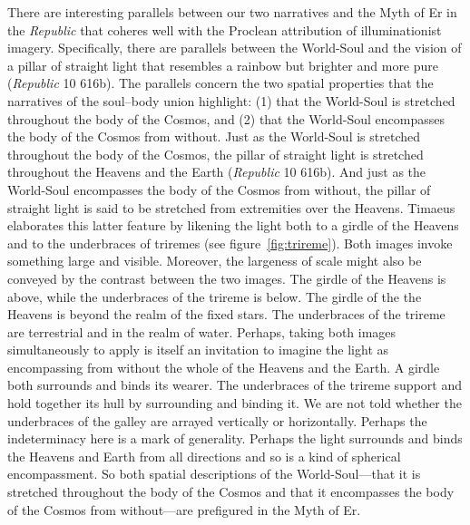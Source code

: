 There are interesting parallels between our two narratives and the Myth of Er in the \emph{Republic} that coheres well with the Proclean attribution of illuminationist imagery. Specifically, there are parallels between the World-Soul and the vision of a pillar of straight light that resembles a rainbow but brighter and more pure (\emph{Republic} 10 616b). The parallels concern the two spatial properties that the narratives of the soul--body union highlight: (1) that the World-Soul is stretched throughout the body of the Cosmos, and (2) that the World-Soul encompasses the body of the Cosmos from without. Just as the World-Soul is stretched throughout the body of the Cosmos, the pillar of straight light is stretched throughout the Heavens and the Earth (\emph{Republic} 10 616b). And just as the World-Soul encompasses the body of the Cosmos from without, the pillar of straight light is said to be stretched from extremities over the Heavens. Timaeus elaborates this latter feature by likening the light both to a girdle of the Heavens and to the underbraces of triremes (see figure~\ref{fig:trireme}). Both images invoke something large and visible. Moreover, the largeness of scale might also be conveyed by the contrast between the two images. The girdle of the Heavens is above, while the underbraces of the trireme is below. The girdle of the the Heavens is beyond the realm of the fixed stars. The underbraces of the trireme are terrestrial and in the realm of water. Perhaps, taking both images simultaneously to apply is itself an invitation to imagine the light as encompassing from without the whole of the Heavens and the Earth. A girdle both surrounds and binds its wearer. The underbraces of the trireme support and hold together its hull by surrounding and binding it. We are not told whether the underbraces of the galley are arrayed vertically or horizontally. Perhaps the indeterminacy here is a mark of generality. Perhaps the light surrounds and binds the Heavens and Earth from all directions and so is a kind of spherical encompassment. So both spatial descriptions of the World-Soul---that it is stretched throughout the body of the Cosmos and that it encompasses the body of the Cosmos from without---are prefigured in the Myth of Er. 

